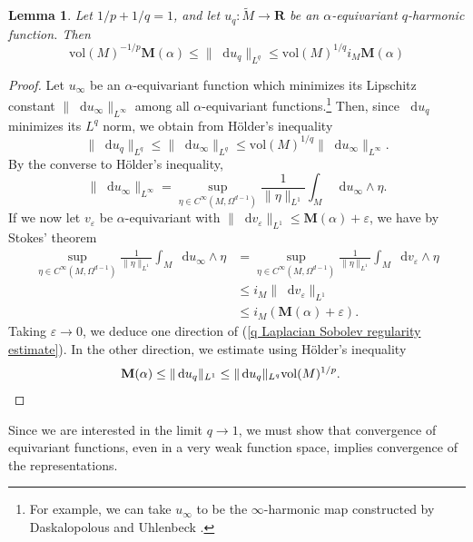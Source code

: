 \documentclass[reqno,11pt]{amsart}
\newcommand{\RR}{\mathbf{R}}
\newcommand*\dif{\mathop{}\!\mathrm{d}}
\newcommand{\vol}{\mathrm{vol}}
\newcommand{\Mass}{\mathbf M}
\newtheorem{lemma}[theorem]{Lemma}
\theoremstyle{definition}
\numberwithin{equation}{section}
\begin{document}
\begin{lemma}
Let $1/p + 1/q = 1$, and let $u_q: \tilde M \to \RR$ be an $\alpha$-equivariant $q$-harmonic function.
Then
\begin{equation}\label{q Laplacian Sobolev regularity estimate}
\vol(M)^{-1/p} \Mass(\alpha) \leq \|\dif u_q\|_{L^q} \leq \vol(M)^{1/q} i_M \Mass(\alpha)
\end{equation}
\end{lemma}
\begin{proof}
Let $u_\infty$ be an $\alpha$-equivariant function which minimizes its Lipschitz constant $\|\dif u_\infty\|_{L^\infty}$ among all $\alpha$-equivariant functions.\footnote{For example, we can take $u_\infty$ to be the $\infty$-harmonic map constructed by Daskalopolous and Uhlenbeck \cite[\S2]{daskalopoulos2020transverse}.}
Then, since $\dif u_q$ minimizes its $L^q$ norm, we obtain from H\"older's inequality
$$\|\dif u_q\|_{L^q} \leq \|\dif u_\infty\|_{L^q} \leq \vol(M)^{1/q} \|\dif u_\infty\|_{L^\infty}.$$
By the converse to H\"older's inequality, 
$$\|\dif u_\infty\|_{L^\infty} = \sup_{\eta \in C^\infty(M, \Omega^{d - 1})} \frac{1}{\|\eta\|_{L^1}} \int_M \dif u_\infty \wedge \eta.$$
If we now let $v_\varepsilon$ be $\alpha$-equivariant with $\|\dif v_\varepsilon\|_{L^1} \leq \Mass(\alpha) + \varepsilon$, we have by Stokes' theorem
\begin{align*}
\sup_{\eta \in C^\infty(M, \Omega^{d - 1})} \frac{1}{\|\eta\|_{L^1}} \int_M \dif u_\infty \wedge \eta 
&= \sup_{\eta \in C^\infty(M, \Omega^{d - 1})} \frac{1}{\|\eta\|_{L^1}} \int_M \dif v_\varepsilon \wedge \eta\\
&\leq i_M \|\dif v_\varepsilon\|_{L^1} \\
&\leq i_M(\Mass(\alpha) + \varepsilon).
\end{align*}
Taking $\varepsilon \to 0$, we deduce one direction of (\ref{q Laplacian Sobolev regularity estimate}).
In the other direction, we estimate using H\"older's inequality
\begin{align*}
\Mass(\alpha) &\leq \|\dif u_q\|_{L^1} \leq \|\dif u_q\|_{L^q} \vol(M)^{1/p}. \qedhere 
\end{align*}
\end{proof}

Since we are interested in the limit $q \to 1$, we must show that convergence of equivariant functions, even in a very weak function space, implies convergence of the representations.
\end{document}
